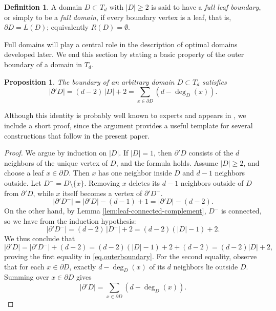 \documentclass[a4paper, 11pt]{article}
\numberwithin{equation}{section}
\newtheorem{proposition}[theorem]{Proposition}
\theoremstyle{definition}
\newtheorem{definition}[theorem]{Definition}
\theoremstyle{remark}
\begin{document}
\medskip 

\begin{definition}
A domain $D\subset T_d$  with $|D|\ge 2$ is said to have a \emph{full leaf boundary}, or simply to be a \emph{full domain},
if every boundary vertex is a leaf, that is, $\partial D = L(D)$; equivalently $R(D)=\emptyset$.
\end{definition}
Full domains will play a central role in the description of optimal domains developed later.
We end this section by stating a basic property of the outer boundary of a domain in $T_d$.
%
\begin{proposition}\label{prop.outerboundary}
The boundary of an arbitrary domain $D\subset T_d $ satisfies
\begin{equation}\label{eq.outerboundary}
   |\partial' D|  = (d-2)\,|D| + 2  = \sum_{x\in\partial D} (d-\deg_D(x)).
\end{equation}
\end{proposition}

\smallskip 

Although this identity is probably well known to experts and appears in \cite{CT}, we include a short proof, since the argument provides a useful template for several constructions that follow in the present paper.

\smallskip 

\begin{proof}
We argue by induction on $|D|$.  If $|D|=1$, then $\partial' D$ consists of the $d$ neighbors of the unique vertex of $D$, and the formula holds. Assume $|D|\ge 2$, and choose a leaf $x\in\partial D$.  
Then $x$ has one neighbor inside $D$ and $d-1$ neighbors outside.  
Let $D^{-}=D\setminus\{x\}$. 
Removing $x$ deletes its $d-1$ neighbors outside of $D$ from $\partial'D$, while $x$ itself becomes a vertex of $\partial' D^{-}$.
$$
    |\partial' D^{-}| = |\partial' D| - (d-1) + 1  = |\partial' D| - (d-2).
$$
On the other hand, by Lemma \ref{lem:leaf-connected-complement},  $D^{-}$ is connected, so we have from  the induction hypothesis:
$$
   |\partial' D^{-}|  =  (d-2)\,|D^{-}| + 2 = (d-2)(|D|-1) + 2.
$$
We thus conclude that 
$$
     |\partial' D|  =   |\partial' D^{-}| + (d-2)  = (d-2)(|D|-1) + 2 +(d-2)  = (d-2) |D|+ 2,
$$
proving the first equality in \eqref{eq.outerboundary}. 
For the second equality, observe that for each $x\in\partial D$, exactly $d-\deg_D(x)$ of its $d$ neighbors lie outside $D$.  
Summing over $x\in\partial D$ gives
\[
   |\partial' D| = \sum_{x\in\partial D} (d-\deg_D(x)).
\]
\end{proof}
\end{document}
